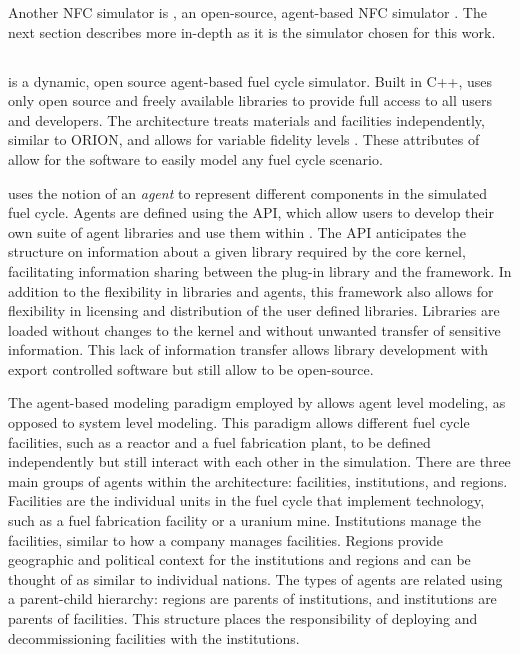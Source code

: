 Another \gls{NFC} simulator is \Cyclus, an open-source, agent-based 
\gls{NFC} simulator \cite{huff_fundamental_2016}. The next section 
describes \Cyclus more in-depth as it is the simulator chosen for this 
work. 

\subsection{\Cyclus}
\Cyclus is a dynamic, open source agent-based fuel cycle simulator. Built 
in C++, \Cyclus uses only open source and freely available libraries to 
provide full access to all users and developers. The 
\Cyclus architecture treats materials and facilities independently, similar 
to ORION, and allows 
for variable fidelity levels \cite{huff_fundamental_2016}. These attributes
of \Cyclus allow for the software to easily model any fuel cycle scenario.

\Cyclus uses the notion of an \textit{agent} to represent different 
components in the simulated fuel cycle. Agents are 
defined using the \Cyclus \gls{API}, which allow 
users 
to develop their own suite of agent libraries and use them within \Cyclus. 
The \gls{API} anticipates the structure on information about a given 
library 
required by the core \Cyclus kernel, facilitating 
information sharing between the plug-in library and the \Cyclus framework. 
In addition to the flexibility in libraries and agents, this framework 
also allows for flexibility in licensing and distribution of the user 
defined libraries. Libraries are loaded without changes to the \Cyclus 
kernel and without unwanted transfer of sensitive information. This lack 
of information transfer allows library development with export controlled 
software but still allow \Cyclus to be open-source.

The agent-based modeling paradigm employed by \Cyclus allows agent level 
modeling, as opposed to system level modeling. This paradigm allows different 
fuel cycle facilities, such as a reactor and a fuel fabrication plant, to 
be defined independently but still interact with each other in the 
simulation. There are three main groups of agents within the \Cyclus 
architecture: facilities, institutions, and regions. Facilities are 
the individual units in the fuel cycle that implement technology, 
such as a fuel fabrication facility or a uranium mine. Institutions 
manage the facilities, similar to how a company manages facilities. 
Regions provide geographic 
and political context for the institutions and regions and can be thought 
of as similar to individual nations. The types of agents are related using 
a parent-child hierarchy: regions are
parents of institutions, and institutions are parents of facilities. This 
structure places the responsibility of deploying and decommissioning 
facilities with the institutions. 


